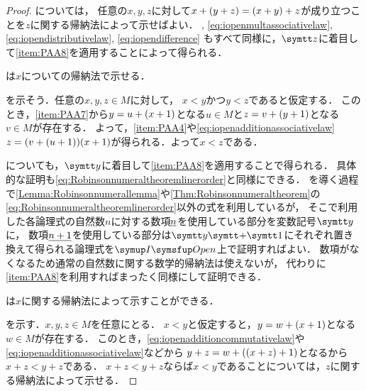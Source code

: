 \begin{proof}
	については，
	任意の\(x, y, z\)に対して\(x + \paren{y + z} = \paren{x + y} + z\)が成り立つことを\(z\)に関する帰納法によって示せばよい．
	,  \cref{eq:iopenmultassociativelaw}, \cref{eq:iopendistributivelaw}, \cref{eq:iopendifference}
	もすべて同様に，\(\obj{z}\)に着目して\cref{item:PAA8}を適用することによって得られる．

	は\(x\)についての帰納法で示せる．

	を示そう．任意の\(x, y, z \in M\)に対して，
	\(x < y\)かつ\(y < z\)であると仮定する．
	このとき，\cref{item:PAA7}から\(y = u + \paren{x + 1}\)となる\(u \in M\)と\(z = v + \paren{y + 1}\)となる\(v \in M\)が存在する．
	よって，\cref{item:PAA4}や\cref{eq:iopenadditionassociativelaw}
	\(z = \paren{v + \paren{u + 1}} \paren{x + 1}\)が得られる．よって\(x < z\)である．

	についても，\(\obj{y}\)に着目して\cref{item:PAA8}を適用することで得られる．
	具体的な証明も\cref{eq:Robinsonnumeraltheoremlinerorder}と同様にできる．
	を導く過程で\cref{Lemma:Robinsonnumerallemma}や\cref{Thm:Robinsonnumeraltheorem}の
	\cref{eq:Robinsonnumeraltheoremlinerorder}以外の式を利用しているが，
	そこで利用した各論理式の自然数\(n\)に対する数項\(\underline{n}\)を使用している部分を変数記号\(\obj{y}\)に，
	数項\(\underline{n + 1}\)を使用している部分は\(\obj{y} \obj{+} \obj{1}\)にそれぞれ置き換えて得られる論理式を\(\OpenFormulaInduction\)上で証明すればよい．
	数項がなくなるため通常の自然数に関する数学的帰納法は使えないが，
	代わりに\cref{item:PAA8}を利用すればまったく同様にして証明できる．

	は\(x\)に関する帰納法によって示すことができる．

	を示す．\(x, y, z \in M\)を任意にとる．
	\(x < y\)と仮定すると，\(y = w + \paren{x + 1}\)となる\(w \in M\)が存在する．
	このとき，\cref{eq:iopenadditioncommutativelaw}や\cref{eq:iopenadditionassociativelaw}などから
	\(y + z = w + \paren{\paren{x + z} + 1}\)となるから\(x + z < y + z\)である．
	\(x + z < y + z\)ならば\(x < y\)であることについては，\(z\)に関する帰納法によって示せる．


\end{proof}
